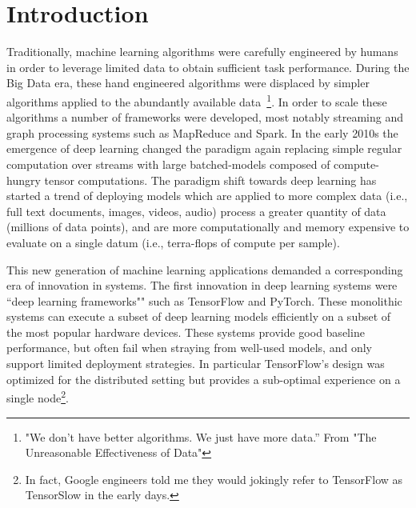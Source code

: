 \chapter{Introduction}
\label{ch:intro}

Traditionally, machine learning algorithms were carefully engineered by humans
  in order to leverage limited data to obtain sufficient task performance.
During the Big Data era, these hand engineered algorithms were displaced by
  simpler algorithms applied to the abundantly available data~\citep{unreasonable}\footnote{"We don’t have better algorithms. We just have more data.” From "The Unreasonable Effectiveness of Data"}.
In order to scale these algorithms a number of frameworks were
  developed, most notably streaming and graph processing systems such as MapReduce and Spark.
In the early 2010s the emergence of deep learning changed the paradigm again
  replacing simple regular computation over streams with large batched-models
  composed of compute-hungry tensor computations.
The paradigm shift towards deep learning has started a trend of deploying models
  which are applied to more complex data (i.e., full text documents, images, videos, audio)
  process a greater quantity of data (millions of data points),
  and are more computationally and memory expensive to evaluate on a single datum (i.e., terra-flops of compute per sample).

This new generation of machine learning applications demanded a corresponding era of
  innovation in systems.
The first innovation in deep learning systems were
  ``deep learning frameworks"" such as TensorFlow and PyTorch.
These monolithic systems can execute a subset of deep learning models
  efficiently on a subset of the most popular hardware devices.
These systems provide good baseline performance, but often fail
  when straying from well-used models, and only support limited deployment strategies.
In particular TensorFlow's design was optimized for the distributed setting
  but provides a sub-optimal experience on a single node\footnote{In fact, Google engineers told me they would jokingly refer to TensorFlow as TensorSlow in the early days.}.

